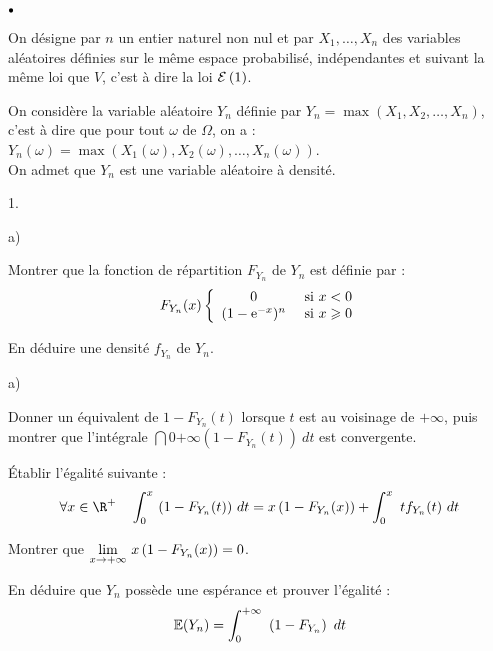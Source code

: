 \documentclass[11pt]{article}%
\begin{document}
\begin{noliste}{$\scriptstyle \bullet$}
\item On désigne par $n$ un entier naturel non nul et par $X_{1},
  \ldots, X_{n}$ des variables aléatoires définies sur le même espace
  probabilisé, indépendantes et suivant la même loi que $V$, c'est à
  dire la loi $\mathcal{E}\left(1\right)$.

\item On considère la variable aléatoire $Y_{n}$ définie par $Y_{n} =
  \max(X_{1},X_{2}, \ldots,X_{n})$, c'est à dire que pour tout
  $\omega$ de $\Omega$, on a : $Y_{n}(\omega) =
  \max(X_{1}(\omega),X_{2}(\omega), \ldots, X_n(\omega))$.\\
  On admet que $Y_{n}$ est une variable aléatoire à densité.
\end{noliste}

\begin{noliste}{1.}
  \setlength{\itemsep}{4mm} %
  \setcounter{enumi}{1}
\item
  \begin{noliste}{a)}
    \setlength{\itemsep}{2mm}
  \item Montrer que la fonction de répartition $F_{Y_{n}}$ de $Y_{n}$
    est définie par :
    \[
    F_{Y_{n}}(x) \left\{
      \begin{array}{cl}
        0 & \hbox{ si } x<0\\
        (1-\text{e}^{-x})^{n} & \hbox{ si } x \geqslant 0
      \end{array}
    \right.
    \]
  \item En déduire une densité $f_{Y_{n}}$ de $Y_{n}$.
  \end{noliste}
  
\item
  \begin{noliste}{a)}
    \setlength{\itemsep}{2mm}
  \item Donner un équivalent de $1-F_{Y_{n}}(t)$ lorsque $t$ est au
    voisinage de $ + \infty$, puis montrer que l'intégrale $
    \dint{0}{+ \infty} \left(1-F_{Y_{n}}(t) \right) \ dt$ est
    convergente.
  \item Établir l'égalité suivante :
    \[
    \forall x \in \R^+ \quad \dint{0}{x} (1-F_{Y_{n}}(t)) \ dt =
    x\left(1-F_{Y_{n}}(x)\right) + \dint{0}{x} t f_{Y_{n}}(t) \ dt
    \]
  \item Montrer que \quad $ {\displaystyle \lim_{ x \to + \infty} \ }
    x\left(1-F_{Y_{n}}(x)\right) = 0$.
  \item En déduire que $Y_{n}$ possède une espérance et prouver
    l'égalité :
    \[
    \mathbb{E}(Y_{n}) = \displaystyle \int_{0}^{+ \infty}\  \left(1-F_{Y_{n}}\right) \ dt
    \]
  \end{noliste}
  

\end{noliste}
\end{document}
